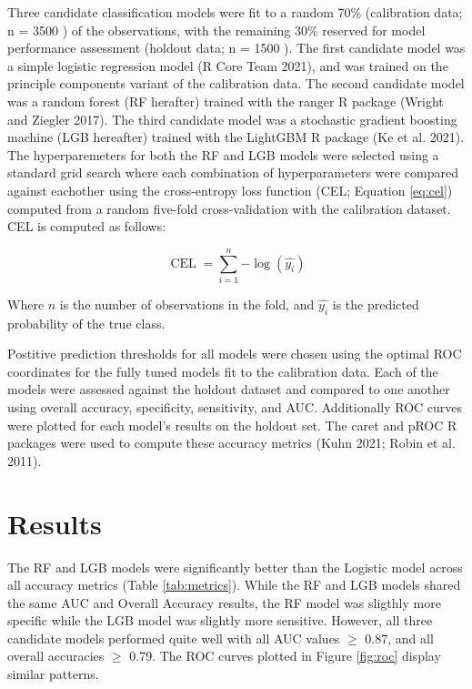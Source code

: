 \documentclass[]{elsarticle} %
\begin{document}
Three candidate classification models were fit to a random 70\%
(calibration data; n =
3500
)
of the observations, with the remaining 30\% reserved for model performance
assessment (holdout data; n =
1500
).
The first candidate model was a simple logistic regression model (R Core Team 2021),
and was trained on the principle components variant of the calibration data.
The second candidate model was a random forest (RF herafter) trained with
the ranger R package (Wright and Ziegler 2017).
The third candidate model was a stochastic gradient boosting machine
(LGB hereafter) trained with the LightGBM R package (Ke et al. 2021).
The hyperparemeters for both the RF and LGB models were selected using a
standard grid search where each combination of hyperparameters were compared
against eachother using the cross-entropy loss function
(CEL; Equation \eqref{eq:cel})
computed from a random five-fold cross-validation with the calibration dataset.
CEL is computed as follows:

\begin{equation}
\operatorname{CEL} = \sum_{i=1}^{n}{-\log{(\hat{y_{i}})}} \label{eq:cel}
\end{equation}

Where \(n\) is the number of observations in the fold, and \(\hat{y_i}\) is
the predicted probability of the true class.

Postitive prediction thresholds for all models were chosen using the optimal
ROC coordinates for the fully tuned models fit to the calibration data.
Each of the models were assessed against the holdout dataset and compared to one
another using overall accuracy, specificity, sensitivity, and AUC.
Additionally ROC curves were plotted for each model's results on the holdout
set.
The caret and pROC R packages were used to compute these accuracy metrics
(Kuhn 2021; Robin et al. 2011).

\hypertarget{results}{%
\section{Results}\label{results}}

The RF and LGB models were significantly better than the Logistic model
across all accuracy metrics (Table \ref{tab:metrics}).
While the RF and LGB models shared the same AUC and Overall Accuracy results,
the RF model was sligthly more specific while the LGB model was slightly more sensitive.
However, all three candidate models performed quite well with
all AUC values \(\geq\) 0.87, and all overall accuracies \(\geq\) 0.79.
The ROC curves plotted in Figure \ref{fig:roc} display similar patterns.
\end{document}
